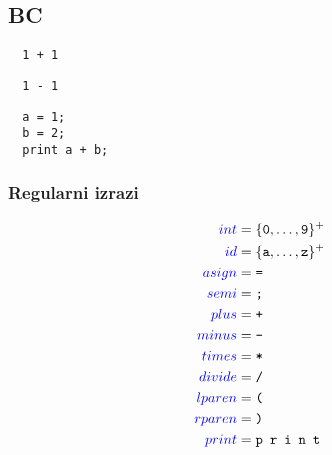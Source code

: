 \documentclass{article}
\newcommand{\Symbol}[1]{\textcolor{blue}{#1}}
\newcommand{\Char}[1]{\texttt{#1}}
\newcommand{\Seq}{{\ \,}}
\newcommand{\KleenePlus}[1]{#1^+}
\begin{document}
\subsection{BC}
\begin{verbatim}
  1 + 1
\end{verbatim}
\begin{verbatim}
  1 - 1
\end{verbatim}
\begin{verbatim}
  a = 1;
  b = 2;
  print a + b;
\end{verbatim}

\subsubsection*{Regularni izrazi}
\begin{equation*}
  \begin{aligned}
    \Symbol{int} &= \KleenePlus{\{\Char{0}, \dots, \Char{9}\}}\\
    \Symbol{id} &= \KleenePlus{\{\Char{a}, \dots, \Char{z}\}}\\
    \Symbol{asign} &= \Char{=}\\
    \Symbol{semi} &= \Char{;}\\
    \Symbol{plus} &= \Char{+}\\
    \Symbol{minus} &= \Char{-}\\
    \Symbol{times} &= \Char{*}\\
    \Symbol{divide} &= \Char{/}\\
    \Symbol{lparen} &= \Char{(}\\
    \Symbol{rparen} &= \Char{)}\\
    \Symbol{print} &= \Char{p} \Seq \Char{r} \Seq \Char{i} \Seq \Char{n} \Seq \Char{t}\\
  \end{aligned}
\end{equation*}
\end{document}
